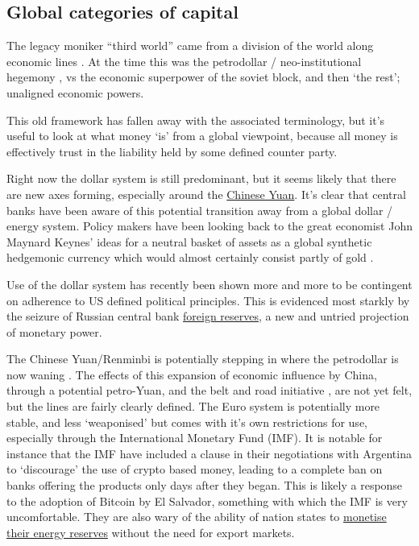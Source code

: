 \subsection{Global categories of capital}
The legacy moniker ``third world'' came from a division of the world along economic lines \cite{tomlinson2003third}. At the time this was the petrodollar / neo-institutional hegemony \cite{caballero2008financial, spiro2019hidden}, vs the economic superpower of the soviet block, and then `the rest'; unaligned economic powers.\par
This old framework has fallen away with the associated terminology, but it's useful to look at what money `is' from a global viewpoint, because all money is effectively trust in the liability held by some defined counter party.\par
Right now the dollar system is still predominant, but it seems likely that there are new axes forming, especially around the \href{https://www.wsj.com/articles/saudi-arabia-considers-accepting-yuan-instead-of-dollars-for-chinese-oil-sales-11647351541}{Chinese Yuan}. It's clear that central banks have been aware of this potential transition away from a global dollar / energy system. Policy makers have been looking back to the great economist John Maynard Keynes' ideas for a neutral basket of assets as a global synthetic hedgemonic currency \cite{carney2019growing, piffaretti2009reshaping} which would almost certainly consist partly of gold \cite{stoeferle2018gold}.\par
Use of the dollar system has recently been shown more and more to be contingent on adherence to US defined political principles. This is evidenced most starkly by the seizure of Russian central bank \href{https://twitter.com/RussianEmbassy/status/1504530573527760909}{foreign reserves}, a new and untried projection of monetary power.\par  
The Chinese Yuan/Renminbi is potentially stepping in where the petrodollar is now waning \cite{mathews2018china}. The effects of this expansion of economic influence by China, through a potential petro-Yuan, and the belt and road initiative \cite{huang2016understanding}, are not yet felt, but the lines are fairly clearly defined. The Euro system is potentially more stable, and less `weaponised' but comes with it's own restrictions for use, especially through the International Monetary Fund (IMF). It is notable for instance that the IMF have included a clause in their negotiations with Argentina to `discourage' the use of crypto based money, leading to a complete ban on banks offering the products only days after they began. This is likely a response to the adoption of Bitcoin by El Salvador, something with which the IMF is very uncomfortable. They are also wary of the ability of nation states to \href{https://www.imf.org/en/Publications/GFSR/Issues/2022/04/19/global-financial-stability-report-april-2022}{monetise their energy reserves} without the need for export markets.\par
